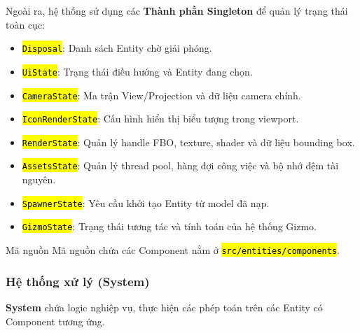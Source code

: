 \documentclass[a4paper]{article}
\newcommand{\code}[1]{\hl{\texttt{#1}}}
\begin{document}
Ngoài ra, hệ thống sử dụng các \textbf{Thành phần Singleton} để quản lý trạng thái toàn cục:
\begin{itemize}
    \item \code{Disposal}: Danh sách Entity chờ giải phóng.
    \item \code{UiState}: Trạng thái điều hướng và Entity đang chọn.
    \item \code{CameraState}: Ma trận View/Projection và dữ liệu camera chính.
    \item \code{IconRenderState}: Cấu hình hiển thị biểu tượng trong viewport.
    \item \code{RenderState}: Quản lý handle FBO, texture, shader và dữ liệu bounding box.
    \item \code{AssetsState}: Quản lý thread pool, hàng đợi công việc và bộ nhớ đệm tài nguyên.
    \item \code{SpawnerState}: Yêu cầu khởi tạo Entity từ model đã nạp.
    \item \code{GizmoState}: Trạng thái tương tác và tính toán của hệ thống Gizmo.
\end{itemize}

\begin{sourcecoderemark}{Mã nguồn}
Mã nguồn chứa các Component nằm ở \code{src/entities/components}.
\end{sourcecoderemark}

\subsubsection{Hệ thống xử lý (System)}
\hspace{12pt}
\textbf{System} chứa logic nghiệp vụ, thực hiện các phép toán trên các Entity có Component tương ứng.
\end{document}
